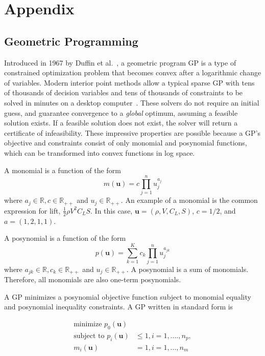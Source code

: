 \chapter{Appendix}
\label{app}

\section{Geometric Programming}
\label{a:gpintro}

Introduced in 1967 by Duffin et al.~\cite{duffingp}, a geometric program \gls{GP} is
a type of constrained optimization problem that becomes convex after a
logarithmic change of variables. Modern interior point methods allow a typical
sparse \gls{GP} with tens of thousands of decision variables and tens of thousands of
constraints to be solved in minutes on a desktop computer~\cite{convex}. These
solvers do not require an initial guess, and guarantee convergence to a
\textit{global} optimum, assuming a feasible solution exists. If a feasible
solution does not exist, the solver will return a certificate of infeasibility.
These impressive properties are possible because a GP's objective and
constraints consist of only monomial and posynomial functions, which can be
transformed into convex functions in log space.

A monomial is a function of the form
\begin{equation}\label{e:monomial}
m(\mathbf{u}) = c\prod_{j=1}^{n} u_{j}^{a_{j}}
\end{equation}
where $a_{j} \in \mathbb{R}, c \in \mathbb{R}_{++}$ and $u_{j} \in
\mathbb{R_{++}}$. An example of a monomial is the common expression for lift,
$\frac{1}{2} \rho V^2C_{L}S$. In this case, $\mathbf{u} = (\rho, V, C_{L}, S)$,
$c= 1/2$, and $a = (1, 2, 1, 1)$.

A posynomial is a function of the form
\begin{equation}\label{e:posynomial}
p(\mathbf{u}) = \sum_{k=1}^{K}c_{k}\prod_{j=1}^{n} u_{j}^{a_{jk}}
\end{equation}
where $a_{jk} \in \mathbb{R}, c_{k} \in \mathbb{R}_{++}$ and $u_{j} \in
\mathbb{R_{++}}$. A posynomial is a sum of monomials. Therefore, all monomials
are also one-term posynomials.

A GP minimizes a posynomial objective function subject to monomial equality and
posynomial inequality constraints. A GP written in standard form is

\begin{equation}
\label{e:standardform}
\begin{aligned}
\text{minimize }p_{0}(\mathbf{u})& \\
\text{subject to }p_{i}(\mathbf{u})& \leq 1, i = 1, ...., n_{p}, \\
m_{i}(\mathbf{u})& = 1, i = 1, ..., n_{m}
\end{aligned}
\end{equation}

